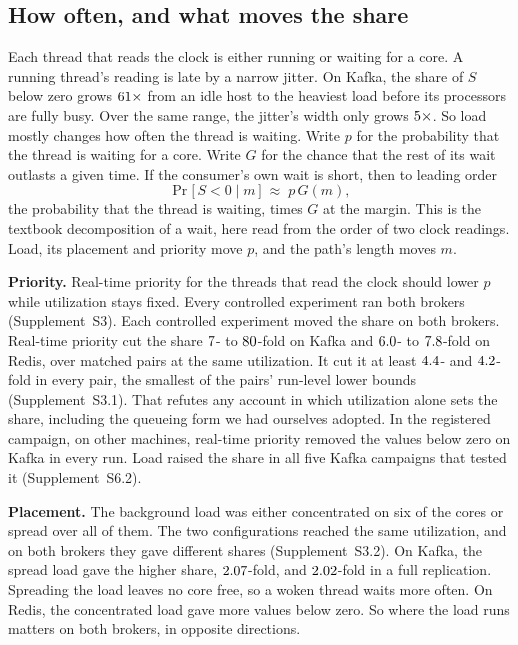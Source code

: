\documentclass[10pt,journal,compsoc]{IEEEtran}
\newcommand{\kafka}{Kafka}
\newcommand{\redis}{Redis}
\begin{document}
\subsection{How often, and what moves the share}
\label{sec:twostate}
\label{sec:mixture}
Each thread that reads the clock is either running or waiting for a core. A running thread's
reading is late by a narrow jitter. On \kafka{}, the share of $S$ below zero grows
$61\times$ from an idle host to the heaviest load before its processors are fully busy.
Over the same range, the jitter's width only grows $5\times$. So load mostly changes how often the thread is waiting. Write $p$
for the probability that the thread is waiting for a core\label{def:occupancy}. Write $G$ for the
chance that the rest of its wait outlasts a given time. If the consumer's own wait is short, then
to leading order
\begin{equation}
\Pr\bigl[\,S<0 \mid m\,\bigr] \;\approx\; p\,G(m) ,
\label{eq:occupancy}
\end{equation}
the probability that the thread is waiting, times $G$ at the margin. This is the textbook decomposition of a wait, here read from the order of two clock
readings. Load, its placement and priority move $p$, and the path's length moves $m$.

\textbf{Priority.} Real-time priority for the threads that read the clock should lower $p$ while
utilization stays fixed. Every controlled experiment ran both brokers (Supplement~S3). Each controlled experiment
moved the share on both brokers. Real-time priority cut the share
$7$- to
$80$-fold on \kafka{} and $6.0$- to $7.8$-fold on \redis{},
over matched pairs at the same utilization.
It cut it at least $4.4$- and $4.2$-fold in every pair, the smallest
of the pairs' run-level lower bounds (Supplement~S3.1). That refutes any account in which utilization alone sets the share, including
the queueing form we had ourselves adopted. In the registered campaign, on other machines,
real-time priority removed the values below zero on \kafka{} in every run. Load raised the share in
all five \kafka{} campaigns that tested it (Supplement~S6.2).

\textbf{Placement.} The background load was either concentrated on six of the \testbedCpusWord{}
cores or spread over all of them. The two configurations reached the same utilization, and on both brokers they gave different shares (Supplement~S3.2). On
\kafka{}, the spread load gave the higher share, $2.07$-fold, and $2.02$-fold
in a full replication.  Spreading the load leaves no core free, so a woken
thread waits more often. On \redis{}, the concentrated load gave more values below zero. So where
the load runs matters on both brokers, in opposite directions.
\end{document}

